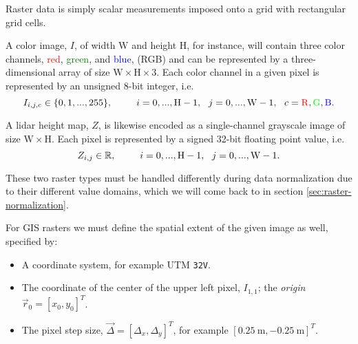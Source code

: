 Raster data is simply scalar measurements imposed onto a grid with rectangular grid cells.

A color image, $I$, of width $\mathrm{W}$ and height $\mathrm{H}$, for instance, will contain three color channels, \textcolor{red}{red}, \textcolor{green}{green}, and \textcolor{blue}{blue}, (RGB) and can be represented by a three-dimensional array of size $\mathrm{W} \times \mathrm{H} \times \mathrm{3}$.
Each color channel in a given pixel is represented by an unsigned 8-bit integer, i.e. \\
\begin{equation*}
  I_{i, j, c} \in \{0, 1, ..., 255\},
  \hspace{2.5em}
  i = 0, ..., \mathrm{H} - 1,
  ~~
  j = 0, ..., \mathrm{W} - 1,
  ~~
  c = \mathrm{\textcolor{red}{R}, \textcolor{green}{G},\textcolor{blue}{B}}.
\end{equation*}

A lidar height map, $Z$, is likewise encoded as a single-channel grayscale image of size $\mathrm{W} \times \mathrm{H}$.
Each pixel is represented by a signed 32-bit floating point value, i.e.
\begin{equation*}
  Z_{i, j} \in \mathbb{R},
  \hspace{2.5em}
  i = 0, ..., \mathrm{H} - 1,
  ~~
  j = 0, ..., \mathrm{W} - 1.
\end{equation*}

These two raster types must be handled differently during data normalization due to their different value domains, which we will come back to in section \ref{sec:raster-normalization}.

\begin{minipage}{\textwidth}
  For GIS rasters we must define the spatial extent of the given image as well, specified by:
  \begin{itemize}[noitemsep]
    \item A coordinate system, for example UTM \texttt{32V}.
    \item The coordinate of the center of the upper left pixel, $I_{1, 1}$; the \textit{origin} $\vec{r}_0 = [x_0, y_0]^T$.
    \item The pixel step size, $\vec{\Delta} = [\Delta_x, \Delta_y]^T$, for example $[\SI{0.25}{\meter}, \SI{-0.25}{\meter}]^T$.
  \end{itemize}
\end{minipage}
\vspace{0.5em}

